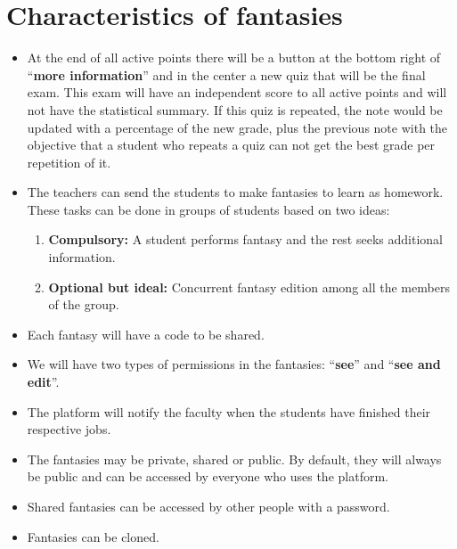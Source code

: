 \section{Characteristics of fantasies}
\begin{itemize}
	\item At the end of all active points there will be a button at the bottom right of ``\textbf{more information}'' and in the center a new quiz that will be the final exam. This exam will have an independent score to all active points and will not have the statistical summary. If this quiz is repeated, the note would be updated with a percentage of the new grade, plus the previous note with the objective that a student who repeats a quiz can not get the best grade per repetition of it.
	\item The teachers can send the students to make fantasies to learn as homework. These tasks can be done in groups of students based on two ideas:
	\begin{enumerate}
		\item \textbf{Compulsory:} A student performs fantasy and the rest seeks additional information.
		\item \textbf{Optional but ideal:} Concurrent fantasy edition among all the members of the group.
	\end{enumerate}
	\item Each fantasy will have a code to be shared.
	\item We will have two types of permissions in the fantasies: ``\textbf{see}'' and ``\textbf{see and edit}''.
	\item The platform will notify the faculty when the students have finished their respective jobs.
	\item The fantasies may be private, shared or public. By default, they will always be public and can be accessed by everyone who uses the platform.
	\item Shared fantasies can be accessed by other people with a password.
	\item Fantasies can be cloned.
\end{itemize}

